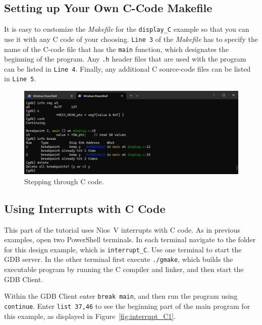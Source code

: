 \documentclass[11pt, twoside, pdftex]{article}
\begin{document}
\subsection{Setting up Your Own C-Code Makefile}
\label{sec:yourownass}

It is easy to customize the {\it Makefile} for the \texttt{display\_C} example so that you
can use it with any C code of your choosing.  \texttt{Line 3} of the
{\it Makefile} has to specify the name of the C-code file that has the \texttt{main}
function, which designates the beginning of the program. Any \texttt{.h} header files that are
used with the program can be listed in \texttt{Line~4}. Finally, any additional 
C source-code files can be listed in \texttt{Line 5}. 

\begin{figure}[H]
    \begin{center}
        \includegraphics[scale=.6]{figures/display_C4.png}
        \caption{Stepping through C code.}
        \label{fig:display_C4}
    \end{center}
\end{figure}

\subsection{Using Interrupts with C Code}

This part of the tutorial uses Nios~V interrupts with C code. 
As in previous examples, open two PowerShell terminals. In each terminal 
navigate to the folder for this design example, which is \texttt{interrupt\_C}. Use one 
terminal to start the GDB server. In the other terminal first execute \texttt{./gmake}, which 
builds the executable program by running the C compiler and linker, and then start the GDB 
Client.

Within the GDB Client enter \texttt{break main}, and then run the program using \texttt{continue}.
Enter \texttt{list 37,46} to see the beginning part of the main program for this example, as 
displayed in Figure~\ref{fig:interrupt_C1}.
\end{document}
